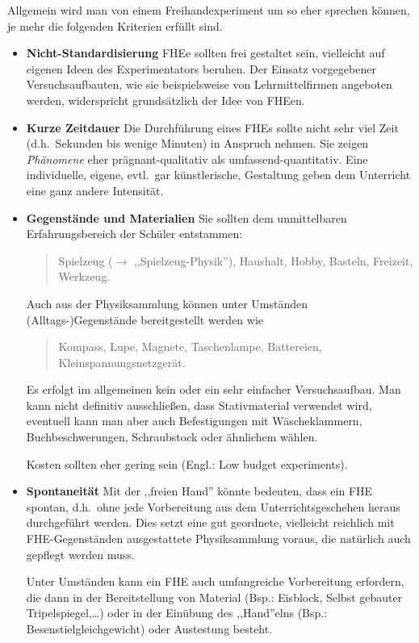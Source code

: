 Allgemein wird man von einem Freihandexperiment um so eher sprechen
k\"{o}nnen, je mehr die folgenden Kriterien erf\"{u}llt sind.
\begin{itemize}
	\item
	{\bf Nicht-Standardisierung}
	FHEe sollten frei gestaltet sein, vielleicht auf eigenen Ideen
	des Experimentators beruhen.
	Der Einsatz vorgegebener Versuchsaufbauten, wie sie
	beispielsweise von Lehrmittelfirmen angeboten werden,
	widerspricht grunds\"{a}tzlich der Idee von FHEen.
	\item
	{\bf Kurze Zeitdauer}
	Die Durchf\"{u}hrung eines FHEs sollte nicht sehr viel Zeit
	(d.h.\ Sekunden bis wenige Minuten) in Anspruch nehmen.
	Sie zeigen {\it Ph\"{a}nomene} eher pr\"{a}gnant-qualitativ als
	umfassend-quantitativ.
	\mip
	Eine individuelle, eigene, evtl.\ gar k\"{u}nstlerische, Gestaltung
	geben dem Unterricht eine ganz andere Intensit\"{a}t.
	
	\item
	{\bf Gegenst\"{a}nde und Materialien}
	Sie sollten dem unmittelbaren Erfahrungsbereich der
	Sch\"{u}ler entstammen:
	\begin{quote}
		Spielzeug ($\to$ ,,Spielzeug-Physik''), Haushalt, Hobby,
		Basteln, Freizeit, Werkzeug.
	\end{quote}
	Auch aus der Physiksammlung k\"{o}nnen unter Umst\"{a}nden
	(Alltags-)Gegenst\"{a}nde bereitgestellt werden wie
	\begin{quote}
		Kompass, Lupe, Magnete, Taschenlampe, Battereien, Kleinspannungsnetzger\"{a}t.
	\end{quote}
	
	\mip
	Es erfolgt im allgemeinen kein oder ein sehr
	einfacher Versuchsaufbau.
	Man kann nicht definitiv ausschlie{\ss}en, dass
	Stativmaterial verwendet wird, eventuell kann man
	aber auch Befestigungen mit W\"{a}scheklammern,
	Buchbeschwerungen, Schraubstock oder \"{a}hnlichem w\"{a}hlen.
	
	\mip
	Kosten sollten eher gering sein (Engl.: Low budget experiments).
	
	\item
	{\bf Spontaneit\"{a}t} Mit der ,,freien Hand'' k\"{o}nnte bedeuten,
	dass ein FHE spontan, d.h.\ ohne jede Vorbereitung aus dem
	Unterrichtsgeschehen heraus durchgef\"{u}hrt werden.
	Dies setzt eine gut geordnete, vielleicht reichlich mit
	FHE-Gegenst\"{a}nden ausgestattete Physiksammlung voraus,
	die nat\"{u}rlich auch gepflegt werden muss.
	
	\mip
	Unter Umst\"{a}nden kann ein FHE auch umfangreiche Vorbereitung
	erfordern, die dann in der Bereitstellung von
	Material
	(Bsp.: Eisblock, Selbst gebauter Tripelspiegel,\dots)
	oder in der Ein\"{u}bung des ,,Hand''elns
	(Bsp.: Besenstielgleichgewicht) oder Austestung besteht.
	

\end{itemize}
